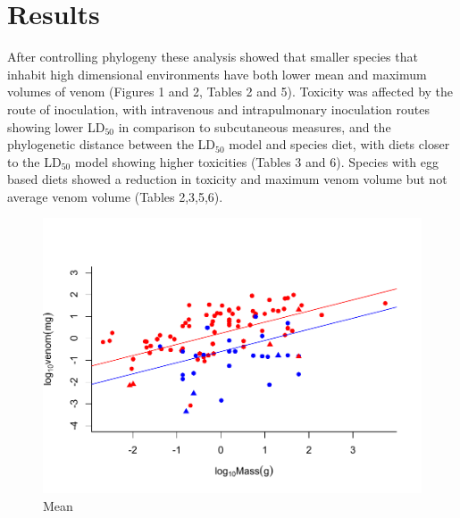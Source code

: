 \section{Results}

After controlling phylogeny these analysis showed that smaller species that inhabit high dimensional environments have both lower mean and maximum volumes of venom (Figures 1 and 2, Tables 2 and 5). Toxicity was affected by the route of inoculation, with intravenous and intrapulmonary inoculation routes showing lower LD$_{50}$ in comparison to subcutaneous measures, and the phylogenetic distance between the LD$_{50}$ model and species diet, with diets closer to the LD$_{50}$ model showing higher toxicities (Tables 3 and 6). Species with egg based diets showed a reduction in toxicity and maximum venom volume but not average venom volume (Tables 2,3,5,6).




\begin{figure}[h!]
  \centering
  \includegraphics[width=.95\textwidth]{ch4-snakes/figure2aver.pdf}%
  \caption[Figure 2a.]{Mean}
  \label{fig:Figure 1.}
\end{figure}




